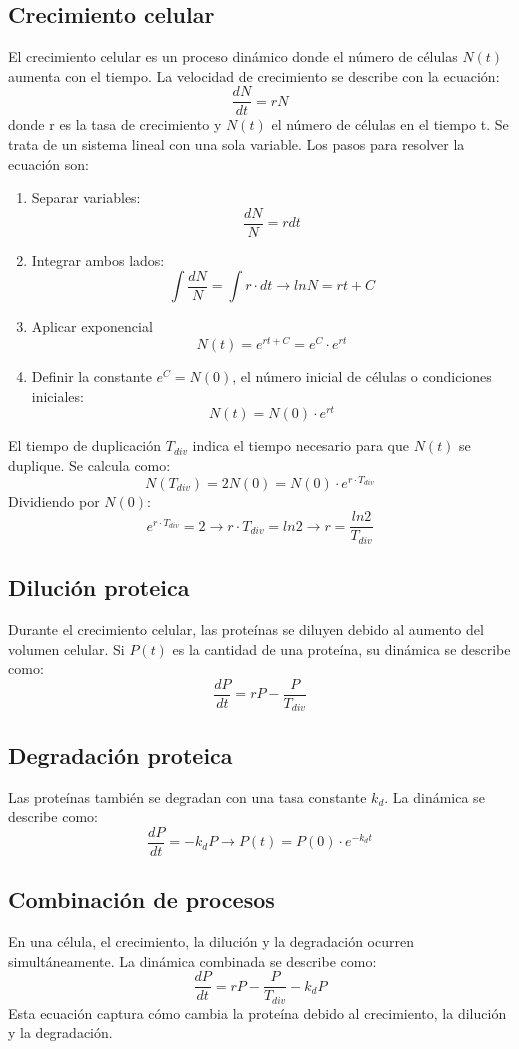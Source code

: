 \subsection{Crecimiento celular}
El crecimiento celular es un proceso dinámico donde el número de células $N(t)$ aumenta con el tiempo. La velocidad de crecimiento se describe con la ecuación:
$$\frac{dN}{dt} = rN$$
donde r es la tasa de crecimiento y $N(t)$ el número de células en el tiempo t. Se trata de un sistema lineal con una sola variable. Los pasos para resolver la ecuación son:
\begin{enumerate}
\item Separar variables:
$$\frac{dN}{N} = r dt$$
\item Integrar ambos lados:
$$\int \frac{dN}{N} = \int r \cdot dt \rightarrow ln N = r t + C$$
\item Aplicar exponencial
$$N(t) = e^{rt + C} = e^C \cdot e^{rt}$$
\item Definir la constante $e^C = N(0)$, el número inicial de células o condiciones iniciales:
$$N(t) = N(0) \cdot e^{rt}$$
\end{enumerate}

El tiempo de duplicación $T_{div}$ indica el tiempo necesario para que $N(t)$ se duplique. Se calcula como:
$$N(T_{div}) = 2N(0) = N(0) \cdot e^{r \cdot T_{div}}$$
Dividiendo por $N(0)$:
$$ e^{r \cdot T_{div}} = 2 \rightarrow r \cdot T_{div} = ln 2 \rightarrow r = \frac{ln 2}{T_{div}}$$

\subsection{Dilución proteica}
Durante el crecimiento celular, las proteínas se diluyen debido al aumento del volumen celular. Si $P(t)$ es la cantidad de una proteína, su dinámica se describe como:
$$\frac{dP}{dt} = rP - \frac{P}{T_{div}}$$

\subsection{Degradación proteica}
Las proteínas también se degradan con una tasa constante $k_d$. La dinámica se describe como:
$$\frac{dP}{dt} = -k_dP \rightarrow P(t) = P(0) \cdot e^{-k_dt}$$

\subsection{Combinación de procesos}
En una célula, el crecimiento, la dilución y la degradación ocurren simultáneamente. La dinámica combinada se describe como:
$$\frac{dP}{dt} = rP - \frac{P}{T_{div}} - k_dP$$
Esta ecuación captura cómo cambia la proteína debido al crecimiento, la dilución y la degradación.

